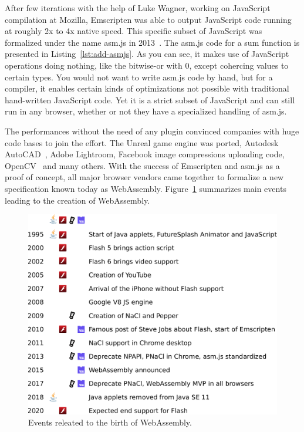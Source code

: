 After few iterations with the help of Luke Wagner, working on JavaScript compilation at Mozilla,
Emscripten was able to output JavaScript code running at roughly 2x to 4x native speed.
This specific subset of JavaScript was formalized under the name asm.js in 2013~\cite{herman2013asm}.
The asm.js code for a sum function is presented in Listing~\ref{lst:add-asmjs}.
As you can see, it makes use of JavaScript operations doing nothing,
like the bitwise-or with 0, except cohercing values to certain types.
You would not want to write asm.js code by hand, but for a compiler,
it enables certain kinds of optimizations not possible with traditional
hand-written JavaScript code.
Yet it is a strict subset of JavaScript and can still run in any browser,
whether or not they have a specialized handling of asm.js.



The performances without the need of any plugin convinced companies with huge
code bases to join the effort.
The Unreal game engine was ported, Autodesk AutoCAD~\cite{autocadweb}, Adobe Lightroom,
Facebook image compressions uploading code, OpenCV~\cite{taheri2018opencv} and many others.
With the success of Emscripten and asm.js as a proof of concept,
all major browser vendors came together to formalize a new specification
known today as WebAssembly.
Figure~\ref{fig:wasm-timeline} summarizes main events leading to the creation of WebAssembly.

\begin{figure}[h]
	\centering
	\includegraphics[width=\linewidth]{assets/img/wasm-timeline.pdf}
	\caption{Events releated to the birth of WebAssembly.}%
	\label{fig:wasm-timeline}
\end{figure}

